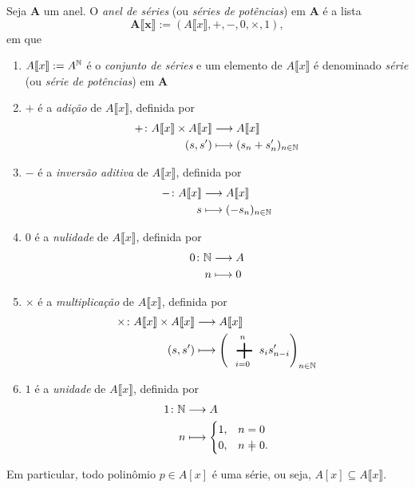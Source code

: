 \begin{definition}
Seja $\bm A$ um anel. O \emph{anel de séries} (ou \emph{séries de potências}) em $\bm A$ é a lista
	\begin{equation*}
	\bm{A\llbracket x \rrbracket} := (A\llbracket x \rrbracket,+,-,0,\times,1),
	\end{equation*}
em que
\begin{enumerate}
	\item $A\llbracket x \rrbracket := A^{\mathbb{N}}$ é o \emph{conjunto de séries} e um elemento de $A\llbracket x \rrbracket$ é denominado \emph{série} (ou \emph{série de potências}) em $\bm A$
	\item $+$ é a \emph{adição} de $A\llbracket x \rrbracket$, definida por
		\begin{align*}
		{+}\colon {A\llbracket x \rrbracket \times A\llbracket x \rrbracket} &\longrightarrow {A\llbracket x \rrbracket} \\{(s,s')} &\longmapsto (s_n+s'_n)_{n \in \mathbb{N}}
		\end{align*}
	\item $-$ é a \emph{inversão aditiva} de $A\llbracket x \rrbracket$, definida por
		\begin{align*}
		{-}\colon {A\llbracket x \rrbracket} &\longrightarrow {A\llbracket x \rrbracket} \\{s} &\longmapsto (-s_n)_{n \in \mathbb{N}}
		\end{align*}
	\item $0$ é a \emph{nulidade} de $A\llbracket x \rrbracket$, definida por
		\begin{align*}
		\func{0}{\N}{A}{n}{0}
		\end{align*}
	\item $\times$ é a \emph{multiplicação} de $A\llbracket x \rrbracket$, definida por
		\begin{align*}
		\func{\times}{A\llbracket x \rrbracket \times A\llbracket x \rrbracket}{A\llbracket x \rrbracket}{(s,s')}{\left(\sum_{i=0}^n s_i s'_{n-i}\right)_{n \in \N}}
		\end{align*}
	\item $1$ é a \emph{unidade} de $A\llbracket x \rrbracket$, definida por
		\begin{align*}
		\func{1}{\N}{A}{n}{
			\begin{cases}
			1,	& n = 0 \\
			0,	& n \neq 0.
		\end{cases}}
		\end{align*}
\end{enumerate}
\end{definition}

Em particular, todo polinômio $p \in A[x]$ é uma série, ou seja, $A[x] \subseteq A\llbracket x \rrbracket$.


